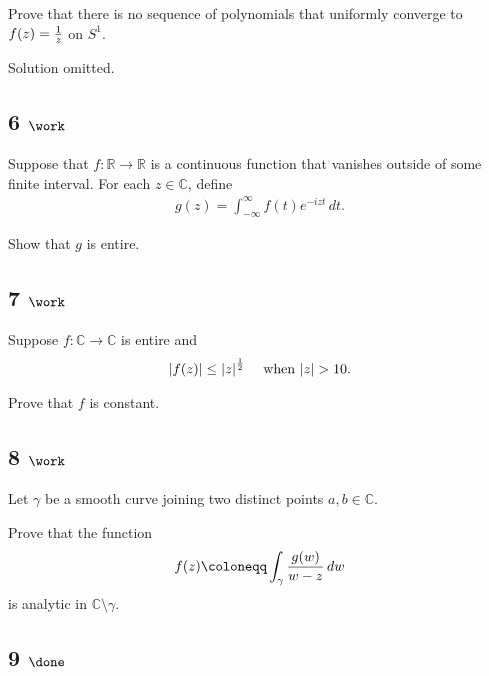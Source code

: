 Prove that there is no sequence of polynomials that uniformly converge
to \(f(z) = {1\over z}\) on \(S^1\).

Solution omitted.

\hypertarget{work-20}{%
\subsection{\texorpdfstring{6
\(\work\)}{6 \textbackslash work}}\label{work-20}}

Suppose that \(f: {\mathbb{R}}\to{\mathbb{R}}\) is a continuous function
that vanishes outside of some finite interval. For each
\(z\in {\mathbb{C}}\), define
\begin{align*}
g(z) = \int_{-\infty}^\infty f(t) e^{-izt} \,dt
.\end{align*}

Show that \(g\) is entire.

\hypertarget{work-21}{%
\subsection{\texorpdfstring{7
\(\work\)}{7 \textbackslash work}}\label{work-21}}

Suppose \(f: {\mathbb{C}}\to {\mathbb{C}}\) is entire and
\begin{align*}
{\left\lvert {f(z)} \right\rvert} \leq {\left\lvert {z} \right\rvert}^{1\over 2} \quad\text{ when } {\left\lvert {z} \right\rvert} > 10
.\end{align*}

Prove that \(f\) is constant.

\hypertarget{work-22}{%
\subsection{\texorpdfstring{8
\(\work\)}{8 \textbackslash work}}\label{work-22}}

Let \(\gamma\) be a smooth curve joining two distinct points
\(a, b\in {\mathbb{C}}\).

Prove that the function
\begin{align*}
f(z) \coloneqq\int_\gamma {g(w) \over w-z} \,dw
\end{align*}
is analytic in \({\mathbb{C}}\setminus\gamma\).

\hypertarget{done-1}{%
\subsection{\texorpdfstring{9
\(\done\)}{9 \textbackslash done}}\label{done-1}}


